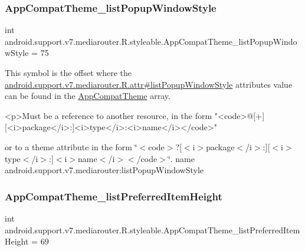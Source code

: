 \subsubsection{\texorpdfstring{App\+Compat\+Theme\+\_\+list\+Popup\+Window\+Style}{AppCompatTheme\_listPopupWindowStyle}}
{\footnotesize\ttfamily int android.\+support.\+v7.\+mediarouter.\+R.\+styleable.\+App\+Compat\+Theme\+\_\+list\+Popup\+Window\+Style = 75\hspace{0.3cm}{\ttfamily [static]}}

This symbol is the offset where the \hyperlink{classandroid_1_1support_1_1v7_1_1mediarouter_1_1R_1_1attr_a8fe9c7c02eb28bd85a85c0e42f4624c4}{android.\+support.\+v7.\+mediarouter.\+R.\+attr\#list\+Popup\+Window\+Style} attribute\textquotesingle{}s value can be found in the \hyperlink{classandroid_1_1support_1_1v7_1_1mediarouter_1_1R_1_1styleable_a4e3d3900c75d49aeb2f283cac00214d6}{App\+Compat\+Theme} array.

\begin{DoxyVerb}      <p>Must be a reference to another resource, in the form "<code>@[+][<i>package</i>:]<i>type</i>:<i>name</i></code>"
\end{DoxyVerb}
 or to a theme attribute in the form \char`\"{}$<$code$>$?\mbox{[}$<$i$>$package$<$/i$>$\+:\mbox{]}\mbox{[}$<$i$>$type$<$/i$>$\+:\mbox{]}$<$i$>$name$<$/i$>$$<$/code$>$\char`\"{}.  name android.\+support.\+v7.\+mediarouter\+:list\+Popup\+Window\+Style \mbox{\label{classandroid_1_1support_1_1v7_1_1mediarouter_1_1R_1_1styleable_a93ebe3b2983e9056ade662b59bf906f0}} 
\subsubsection{\texorpdfstring{App\+Compat\+Theme\+\_\+list\+Preferred\+Item\+Height}{AppCompatTheme\_listPreferredItemHeight}}
{\footnotesize\ttfamily int android.\+support.\+v7.\+mediarouter.\+R.\+styleable.\+App\+Compat\+Theme\+\_\+list\+Preferred\+Item\+Height = 69\hspace{0.3cm}{\ttfamily [static]}}

